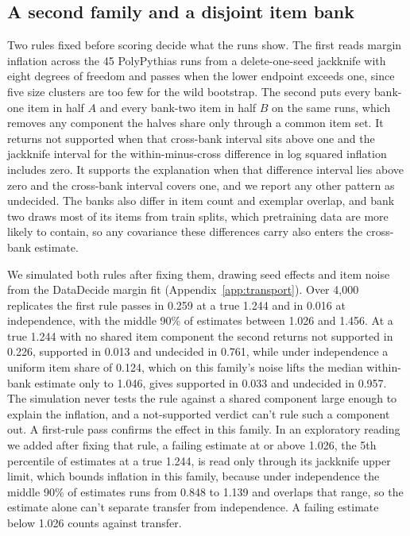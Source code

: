 \subsection{A second family and a disjoint item bank}
\label{sec:family}
Two rules fixed before scoring decide what the runs show. The first reads margin inflation across the 45 PolyPythias runs from a delete-one-seed jackknife with eight degrees of freedom and passes when the lower endpoint exceeds one, since five size clusters are too few for the wild bootstrap. The second puts every bank-one item in half $A$ and every bank-two item in half $B$ on the same runs, which removes any component the halves share only through a common item set. It returns not supported when that cross-bank interval sits above one and the jackknife interval for the within-minus-cross difference in log squared inflation includes zero. It supports the explanation when that difference interval lies above zero and the cross-bank interval covers one, and we report any other pattern as undecided. The banks also differ in item count and exemplar overlap, and bank two draws most of its items from train splits, which pretraining data are more likely to contain, so any covariance these differences carry also enters the cross-bank estimate.

We simulated both rules after fixing them, drawing seed effects and item noise from the DataDecide margin fit (Appendix~\ref{app:transport}). Over 4,000 replicates the first rule passes in 0.259 at a true 1.244 and in 0.016 at independence, with the middle 90\% of estimates between 1.026 and 1.456. At a true 1.244 with no shared item component the second returns not supported in 0.226, supported in 0.013 and undecided in 0.761, while under independence a uniform item share of 0.124, which on this family's noise lifts the median within-bank estimate only to 1.046, gives supported in 0.033 and undecided in 0.957. The simulation never tests the rule against a shared component large enough to explain the inflation, and a not-supported verdict can't rule such a component out. A first-rule pass confirms the effect in this family. In an exploratory reading we added after fixing that rule, a failing estimate at or above 1.026, the 5th percentile of estimates at a true 1.244, is read only through its jackknife upper limit, which bounds inflation in this family, because under independence the middle 90\% of estimates runs from 0.848 to 1.139 and overlaps that range, so the estimate alone can't separate transfer from independence. A failing estimate below 1.026 counts against transfer.

